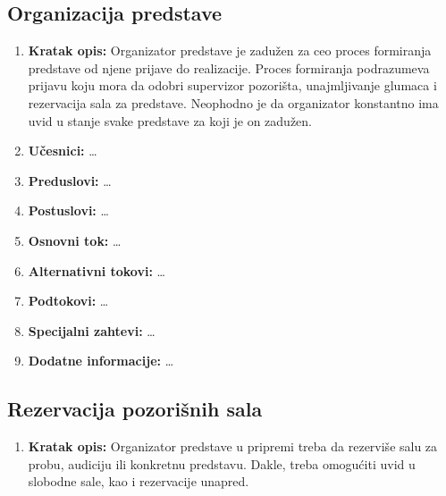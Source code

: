 \documentclass[a4paper]{article}
\begin{document}
\subsection{Organizacija predstave}
\begin{enumerate}
  \item \textbf{Kratak opis:} Organizator predstave je zadužen za ceo proces formiranja predstave od njene prijave do realizacije. 
        Proces formiranja podrazumeva prijavu koju mora da odobri supervizor pozorišta, unajmljivanje 
        glumaca i rezervacija sala za predstave. Neophodno je da organizator konstantno ima uvid u stanje
        svake predstave za koji je on zadužen.
  \item \textbf{Učesnici:} \dots
  \item \textbf{Preduslovi:} \dots
  \item \textbf{Postuslovi:} \dots
  \item \textbf{Osnovni tok:} \dots
  \item \textbf{Alternativni tokovi:} \dots
  \item \textbf{Podtokovi:} \dots
  \item \textbf{Specijalni zahtevi:} \dots
  \item \textbf{Dodatne informacije:} \dots
\end{enumerate}

\subsection{Rezervacija pozorišnih sala}
\begin{enumerate}
  \item \textbf{Kratak opis:} Organizator predstave u pripremi treba da rezerviše salu za probu, 
        audiciju ili konkretnu predstavu. Dakle, treba omogućiti uvid u slobodne sale, 
        kao i rezervacije unapred.
\end{enumerate}
\end{document}
